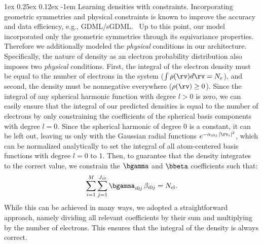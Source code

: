 \documentclass[12pt]{article}
\makeatletter
\renewcommand\paragraph{\@startsection{paragraph}{4}{\parindent}%
  {1ex \@plus 0.25ex \@minus 0.12ex}%
  {-1em}%
  {\normalfont\normalsize\itshape}}
\makeatother
\begin{document}
\paragraph{Learning densities with constraints.}
Incorporating geometric symmetries and physical constraints is known to improve the accuracy and data efficiency, e.g., GDML/sGDML.~\cite{chmiela2017machine,chmiela2018towards}  
Up to this point, our model incorporated only the geometric symmetries through its equivariance properties. Therefore we additionally modeled the \emph{physical} conditions in our architecture. Specifically, the nature of density as an electron probability distribution also imposes two \emph{physical} conditions. First, the integral of the electron density must be equal to the number of electrons in the system ($\int \rho(\rv) d\rv = N_e$), and second, the density must be nonnegative everywhere ($\rho(\rv) \geq 0$). 
Since the integral of any spherical harmonic function with degree $l > 0$ is zero, we can easily ensure that the integral of our predicted densities is equal to the number of electrons by only constraining the coefficients of the spherical basis components with degree $l=0$. Since the spherical harmonic of degree $0$ is a constant, it can be left out, leaving us only with the Gaussian radial functions $e^{-\alpha_{i0j}\,|\rv_i|^2}$, which can be normalized analytically to set the integral of all atom-centered basis functions with degree $l=0$ to 1. Then, to guarantee that the density integrates to the correct value, we constrain the $\bgamma$ and $\bbeta$ coefficients such that:
\begin{equation}\label{eq:dens_constraint}
  \sum_{i=1}^M \sum_{j=1}^{J_{i0}}\bgamma_{i0j}\,\beta_{i0j} = N_\mathrm{el}.
\end{equation}
While this can be achieved in many ways, we adopted a straightforward approach, namely dividing all relevant coefficients by their sum and multiplying by the number of electrons. This ensures that the integral of the density is always correct. 
\end{document}
